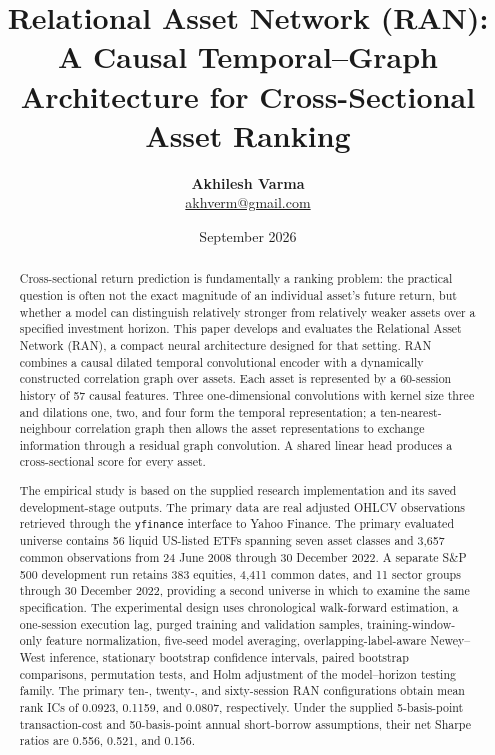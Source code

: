 \documentclass[10pt]{article}
\title{\textbf{Relational Asset Network (RAN):}\\
A Causal Temporal--Graph Architecture for Cross-Sectional Asset Ranking}
\author{\textbf{Akhilesh Varma}\\
\small\href{mailto:akhverm@gmail.com}{akhverm@gmail.com}}
\date{September 2026}
\begin{document}
\maketitle

\begin{abstract}
Cross-sectional return prediction is fundamentally a ranking problem: the practical question is often not the exact magnitude of an individual asset's future return, but whether a model can distinguish relatively stronger from relatively weaker assets over a specified investment horizon. This paper develops and evaluates the Relational Asset Network (RAN), a compact neural architecture designed for that setting. RAN combines a causal dilated temporal convolutional encoder with a dynamically constructed correlation graph over assets. Each asset is represented by a 60-session history of 57 causal features. Three one-dimensional convolutions with kernel size three and dilations one, two, and four form the temporal representation; a ten-nearest-neighbour correlation graph then allows the asset representations to exchange information through a residual graph convolution. A shared linear head produces a cross-sectional score for every asset.

The empirical study is based on the supplied research implementation and its saved development-stage outputs. The primary data are real adjusted OHLCV observations retrieved through the \texttt{yfinance} interface to Yahoo Finance. The primary evaluated universe contains 56 liquid US-listed ETFs spanning seven asset classes and 3,657 common observations from 24 June 2008 through 30 December 2022. A separate S\&P 500 development run retains 383 equities, 4,411 common dates, and 11 sector groups through 30 December 2022, providing a second universe in which to examine the same specification. The experimental design uses chronological walk-forward estimation, a one-session execution lag, purged training and validation samples, training-window-only feature normalization, five-seed model averaging, overlapping-label-aware Newey--West inference, stationary bootstrap confidence intervals, paired bootstrap comparisons, permutation tests, and Holm adjustment of the model--horizon testing family. The primary ten-, twenty-, and sixty-session RAN configurations obtain mean rank ICs of 0.0923, 0.1159, and 0.0807, respectively. Under the supplied 5-basis-point transaction-cost and 50-basis-point annual short-borrow assumptions, their net Sharpe ratios are 0.556, 0.521, and 0.156.


\end{abstract}
\end{document}
